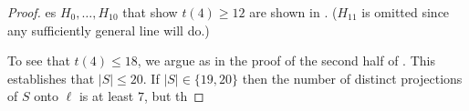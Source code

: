 \documentclass{cccg10}
\begin{document}
\begin{proof}
es $H_0,\ldots,H_{10}$ that show $t(4)\ge 12$
are shown in .  ($H_{11}$ is omitted since any sufficiently
general line will do.)

To see that $t(4) \le 18$, we argue as in the proof of the second half
of .  This establishes that $|S|\le 20$.  If $|S|\in\{19,20\}$
then the number of distinct projections of $S$ onto $\ell$ is at least $7$,
but th
\end{proof}
\end{document}
